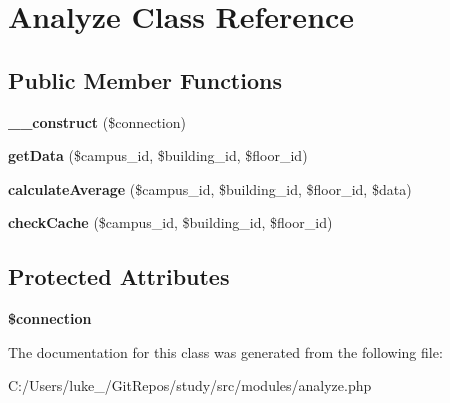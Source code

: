 \hypertarget{class_analyze}{}\section{Analyze Class Reference}
\label{class_analyze}
\subsection*{Public Member Functions}
\begin{DoxyCompactItemize}
\item 
\mbox{\label{class_analyze_a155afedbdfa01f1c0b813ca97642cdab}} 
{\bfseries \+\_\+\+\_\+construct} (\$connection)
\item 
\mbox{\label{class_analyze_af5e2e7551c55064cb4e5d364eec9535a}} 
{\bfseries get\+Data} (\$campus\+\_\+id, \$building\+\_\+id, \$floor\+\_\+id)
\item 
\mbox{\label{class_analyze_aad0040b7a05fdb9aca1ec30bdc2d1b38}} 
{\bfseries calculate\+Average} (\$campus\+\_\+id, \$building\+\_\+id, \$floor\+\_\+id, \$data)
\item 
\mbox{\label{class_analyze_aab8309a23571a73077405957608a54f7}} 
{\bfseries check\+Cache} (\$campus\+\_\+id, \$building\+\_\+id, \$floor\+\_\+id)
\end{DoxyCompactItemize}
\subsection*{Protected Attributes}
\begin{DoxyCompactItemize}
\item 
\mbox{\label{class_analyze_a0d9c79b9b86b3f5891c6d3892f12c6a0}} 
{\bfseries \$connection}
\end{DoxyCompactItemize}


The documentation for this class was generated from the following file\+:\begin{DoxyCompactItemize}
\item 
C\+:/\+Users/luke\+\_\+/\+Git\+Repos/study/src/modules/analyze.\+php\end{DoxyCompactItemize}
